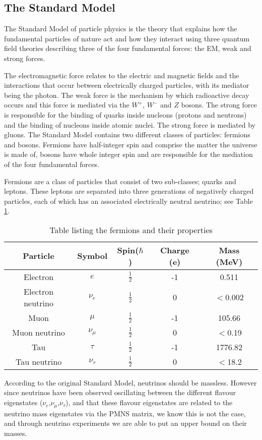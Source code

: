 \documentclass[11pt,oneside,a4paper]{article}
\begin{document}
\subsection{The Standard Model}

The Standard Model of particle physics is the theory that explains how the fundamental particles of nature act and how they interact using three quantum field theories describing three of the four fundamental forces: the EM, weak and strong forces.

The electromagnetic force relates to the electric and magnetic fields and the interactions that occur between electrically charged particles, with its mediator being the photon. The weak force is the mechanism by which radioactive decay occurs and this force is mediated via the $W^+$, $W^-$ and $Z$ bosons. The strong force is responsible for the binding of quarks inside nucleons (protons and neutrons) and the binding of nucleons inside atomic nuclei. The strong force is mediated by gluons. The Standard Model contains two different classes of particles: fermions and bosons. Fermions have half-integer spin and comprise the matter the universe is made of, bosons have whole integer spin and are responsible for the mediation of the four fundamental forces.

Fermions are a class of particles that consist of two sub-classes; quarks and leptons. These leptons are separated into three generations of negatively charged particles, each of which has an associated electrically neutral neutrino; see Table \ref{table:leptons}.
\begin{table}[h!]
\begin{center}
	\begin{tabular}{||c c c c c||} 
		\hline
		Particle & Symbol & Spin($\hbar$) & Charge (e) &  Mass (MeV) \\ [0.5ex] 
		\hline\hline
		Electron & $e$ & $\frac{1}{2}$ & -1 & 0.511  \\ 
		Electron neutrino & $\nu_{e}$ & $\frac{1}{2}$  & 0 & $<$0.002 \\
		\hline
		Muon & $\mu$ & $\frac{1}{2}$  & -1 & 105.66 \\
		Muon neutrino & $\nu_{\mu}$ & $\frac{1}{2}$ & 0 & $<$0.19 \\
		\hline
		Tau & $\tau$ & $\frac{1}{2}$ & -1 & 1776.82 \\ 
		Tau neutrino & $\nu_{\tau}$ & $\frac{1}{2}$ & 0 & $<$18.2 \\ [1 ex] 
		\hline
	\end{tabular}
\caption{Table listing the fermions and their properties}
\label{table:leptons}
\end{center}
\end{table}
According to the original Standard Model, neutrinos should be massless. However since neutrinos have been observed oscillating between the different flavour eigenstates ($\nu_{e}$,$\nu_{\mu}$,$\nu_{\tau}$), and that these flavour eigenstates are related to the neutrino mass eigenstates via the PMNS matrix, we know this is not the case, and through neutrino experiments we are able to put an upper bound on their masses.
\end{document}
